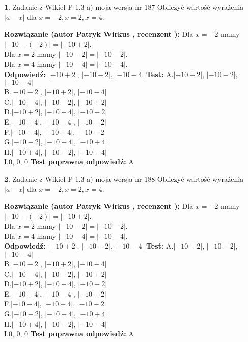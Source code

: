 \documentclass[12pt, a4paper]{article}
\theoremstyle{definition} %
\newtheorem{zad}{}
\newcommand{\zadStart}[1]{\begin{zad}#1\newline}
\newcommand{\zadStop}{\end{zad}}
\newcommand{\rozwStart}[2]{\noindent \textbf{Rozwiązanie (autor #1 , recenzent #2): }\newline}
\newcommand{\rozwStop}{\newline}
\newcommand{\odpStart}{\noindent \textbf{Odpowiedź:}\newline}
\newcommand{\odpStop}{\newline}
\newcommand{\testStart}{\noindent \textbf{Test:}\newline}
\newcommand{\testStop}{\newline}
\newcommand{\kluczStart}{\noindent \textbf{Test poprawna odpowiedź:}\newline}
\newcommand{\kluczStop}{\newline}
\begin{document}
\zadStart{Zadanie z Wikieł P 1.3 a) moja wersja nr 187}
Obliczyć wartość wyrażenia $|a - x|$ dla $x=-2,x=2,x=4$.
\zadStop
\rozwStart{Patryk Wirkus}{}
Dla $x = -2$ mamy $|-10 - (-2)| = |-10 + 2|$.\\
Dla $x = 2$ mamy $|-10 - 2| = |-10 - 2|$.\\
Dla $x = 4$ mamy $|-10 - 4| = |-10 - 4|$.\\
\rozwStop
\odpStart
$|-10 + 2|$, $|-10 - 2|$, $|-10 - 4|$
\odpStop
\testStart
A.$|-10 + 2|$, $|-10 - 2|$, $|-10 - 4|$\\
B.$|-10 - 2|$, $|-10 + 2|$, $|-10 - 4|$\\
C.$|-10 - 4|$, $|-10 - 2|$, $|-10 + 2|$\\
D.$|-10 + 2|$, $|-10 - 4|$, $|-10 - 2|$\\
E.$|-10 + 4|$, $|-10 - 4|$, $|-10 - 2|$\\
F.$|-10 - 4|$, $|-10 + 4|$, $|-10 - 2|$\\
G.$|-10 - 2|$, $|-10 - 4|$, $|-10 + 4|$\\
H.$|-10 + 4|$, $|-10 - 2|$, $|-10 - 4|$\\
I.$0$, $0$, $0$
\testStop
\kluczStart
A
\kluczStop



\zadStart{Zadanie z Wikieł P 1.3 a) moja wersja nr 188}
Obliczyć wartość wyrażenia $|a - x|$ dla $x=-2,x=2,x=4$.
\zadStop
\rozwStart{Patryk Wirkus}{}
Dla $x = -2$ mamy $|-10 - (-2)| = |-10 + 2|$.\\
Dla $x = 2$ mamy $|-10 - 2| = |-10 - 2|$.\\
Dla $x = 4$ mamy $|-10 - 4| = |-10 - 4|$.\\
\rozwStop
\odpStart
$|-10 + 2|$, $|-10 - 2|$, $|-10 - 4|$
\odpStop
\testStart
A.$|-10 + 2|$, $|-10 - 2|$, $|-10 - 4|$\\
B.$|-10 - 2|$, $|-10 + 2|$, $|-10 - 4|$\\
C.$|-10 - 4|$, $|-10 - 2|$, $|-10 + 2|$\\
D.$|-10 + 2|$, $|-10 - 4|$, $|-10 - 2|$\\
E.$|-10 + 4|$, $|-10 - 4|$, $|-10 - 2|$\\
F.$|-10 - 4|$, $|-10 + 4|$, $|-10 - 2|$\\
G.$|-10 - 2|$, $|-10 - 4|$, $|-10 + 4|$\\
H.$|-10 + 4|$, $|-10 - 2|$, $|-10 - 4|$\\
I.$0$, $0$, $0$
\testStop
\kluczStart
A
\kluczStop
\end{document}
